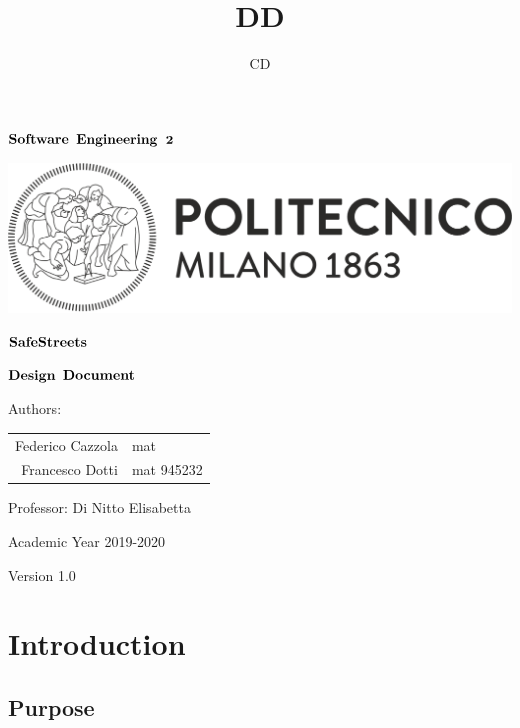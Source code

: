 \documentclass{article}
\author{CD}
\title{DD}
\begin{document}

\thispagestyle{empty} %
\begin{center}

	\vspace{3cm}

	\large $\bf Software$ $\bf Engineering$ $\bf 2$

  \includegraphics[width=\linewidth]{../RASD/images/polimi-logo.png}
  \vspace{2cm}
  

  \Huge $\bf SafeStreets$


	\huge $\bf Design$  $\bf Document$

	\vspace{1cm}

  Authors:
	\vspace{1cm}
	\begin{tabular}{r|l}
		 Federico Cazzola & \large mat\\
		 Francesco Dotti & \large mat 945232\\
	\end{tabular}

	\vspace{1cm}

  Professor: Di Nitto Elisabetta
	
	\vspace{3cm}
  \normalsize Academic Year 2019-2020

	\vspace{2mm}
	\small Version 1.0

\end{center}

\newpage

\tableofcontents

\newpage
  
\section{Introduction}
\subsection{Purpose}
\end{document}
